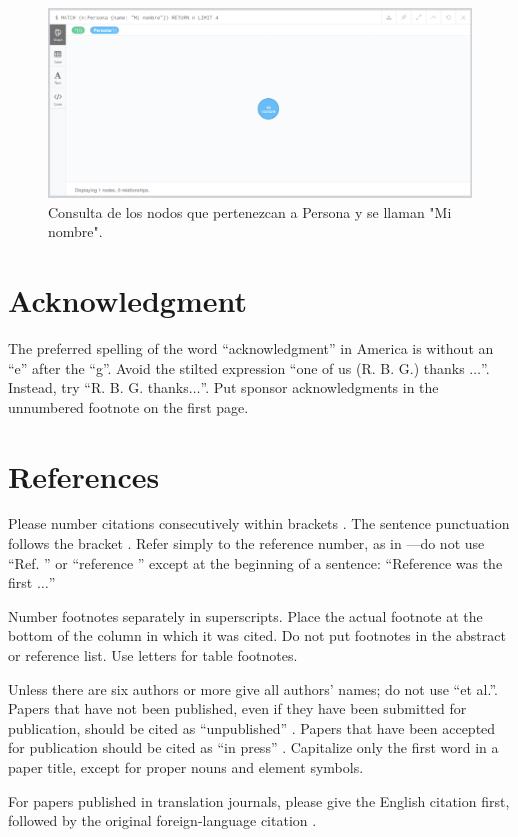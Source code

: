 \documentclass[conference]{IEEEtran}
\begin{document}
\begin{figure}[H]
\begin{center}
\includegraphics[width= 0.45 \textwidth]{consulta_label2.png}
\end{center}
\caption{Consulta de los nodos que pertenezcan a Persona y se llaman "Mi nombre".}
\label{fig23}
\end{figure}


\section*{Acknowledgment}

The preferred spelling of the word ``acknowledgment'' in America is without 
an ``e'' after the ``g''. Avoid the stilted expression ``one of us (R. B. 
G.) thanks $\ldots$''. Instead, try ``R. B. G. thanks$\ldots$''. Put sponsor 
acknowledgments in the unnumbered footnote on the first page.

\section*{References}

Please number citations consecutively within brackets \cite{b1}. The 
sentence punctuation follows the bracket \cite{b2}. Refer simply to the reference 
number, as in \cite{b3}---do not use ``Ref. \cite{b3}'' or ``reference \cite{b3}'' except at 
the beginning of a sentence: ``Reference \cite{b3} was the first $\ldots$''

Number footnotes separately in superscripts. Place the actual footnote at 
the bottom of the column in which it was cited. Do not put footnotes in the 
abstract or reference list. Use letters for table footnotes.

Unless there are six authors or more give all authors' names; do not use 
``et al.''. Papers that have not been published, even if they have been 
submitted for publication, should be cited as ``unpublished'' \cite{b4}. Papers 
that have been accepted for publication should be cited as ``in press'' \cite{b5}. 
Capitalize only the first word in a paper title, except for proper nouns and 
element symbols.

For papers published in translation journals, please give the English 
citation first, followed by the original foreign-language citation \cite{b6}.
\end{document}

